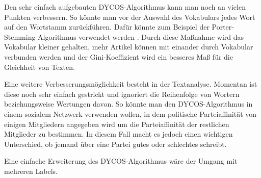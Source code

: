 Den sehr einfach aufgebauten DYCOS-Algorithmus kann man noch an
vielen Punkten verbessern. So könnte man vor der Auswahl des
Vokabulars jedes Wort auf den Wortstamm zurückführen.
Dafür könnte zum Beispiel der Porter-Stemming-Algorithmus verwendet 
werden \cite{porter}. Durch diese Maßnahme wird das
Vokabular kleiner gehalten, mehr Artikel können mit einander
durch Vokabular verbunden werden und der Gini-Koeffizient wird ein
besseres Maß für die Gleichheit von Texten.

Eine weitere Verbesserungsmöglichkeit besteht in der Textanalyse.
Momentan ist diese noch sehr einfach gestrickt und ignoriert die
Reihenfolge von Wortern beziehungsweise Wertungen davon. So könnte
man den DYCOS-Algorithmus in einem sozialem Netzwerk verwenden wollen,
in dem politische Parteiaffinität von einigen Mitgliedern angegeben
wird um die Parteiaffinität der restlichen Mitglieder zu bestimmen.
In diesem Fall macht es jedoch einen wichtigen Unterschied, ob jemand
über eine Partei gutes oder schlechtes schreibt.

Eine einfache Erweiterung des DYCOS-Algorithmus wäre der Umgang mit 
mehreren Labels.
